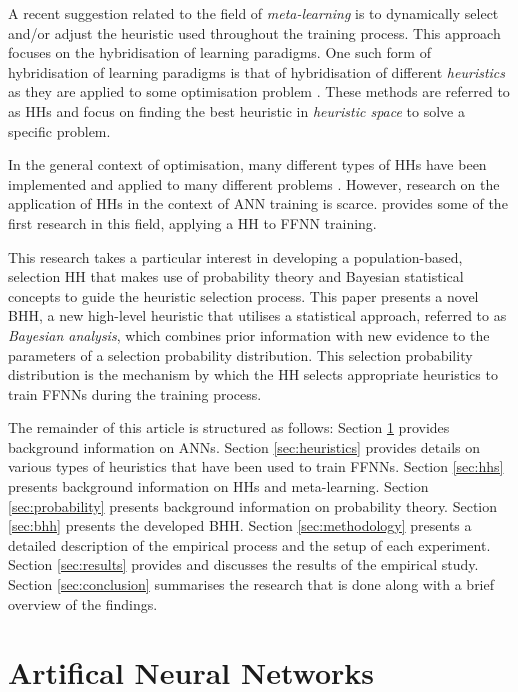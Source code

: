 \documentclass[preprint,review,12pt]{elsarticle}
\begin{document}
A recent suggestion related to the field of \textit{meta-learning} is to dynamically select and/or adjust the heuristic used throughout the training process. This approach focuses on the hybridisation of learning paradigms. One such form of hybridisation of learning paradigms is that of hybridisation of different \textit{heuristics} as they are applied to some optimisation problem \citep{ref:burke:2013}. These methods are referred to as \acfp{HH} and focus on finding the best heuristic in \textit{heuristic space} to solve a specific problem.

In the general context of optimisation, many different types of \acp{HH} have been implemented and applied to many different problems \citep{ref:burke:2013}. However, research on the application of \acp{HH} in the context of \acs{ANN} training is scarce. \citet{ref:nel:2021} provides some of the first research in this field, applying a \acs{HH} to \acf{FFNN} training.

This research takes a particular interest in developing a population-based, selection \acs{HH} that makes use of probability theory and Bayesian statistical concepts to guide the heuristic selection process. This paper presents a novel \acf{BHH}, a new high-level heuristic that utilises a statistical approach, referred to as \textit{Bayesian analysis}, which combines prior information with new evidence to the parameters of a selection probability distribution. This selection probability distribution is the mechanism by which the \acs{HH} selects appropriate heuristics to train \acp{FFNN} during the training process.

The remainder of this article is structured as follows: Section \ref{sec:anns} provides background information on \acp{ANN}. Section \ref{sec:heuristics} provides details on various types of heuristics that have been used to train \acp{FFNN}. Section \ref{sec:hhs} presents background information on \acp{HH} and meta-learning. Section \ref{sec:probability} presents background information on probability theory. Section \ref{sec:bhh} presents the developed \acs{BHH}. Section \ref{sec:methodology} presents a detailed description of the empirical process and the setup of each experiment. Section \ref{sec:results} provides and discusses the results of the empirical study. Section \ref{sec:conclusion} summarises the research that is done along with a brief overview of the findings.

\section{Artifical Neural Networks}
\label{sec:anns}
\end{document}
